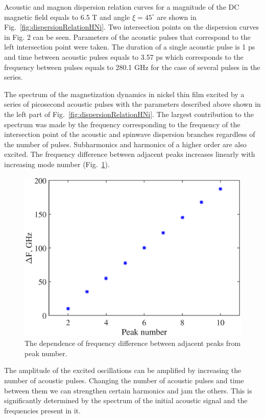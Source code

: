 \documentclass[%
superscriptaddress,
preprint,
showpacs,
amsmath,
amssymb,
aps,
prl,
]{revtex4-1}
\begin{document}
Acoustic and magnon dispersion relation curves for a magnitude of the DC magnetic field equals to 6.5 T and angle $\xi = 45^{\circ}$  are shown in Fig.~\ref{fig:dispersionRelationHNi}. Two intersection points on the dispersion curves in Fig. 2 can be seen. Parameters of the acoustic pulses that correspond to the left intersection point were taken. The duration of a single acoustic pulse is 1 ps and time between acoustic pulses equals to 3.57 ps which corresponds to the frequency between pulses equals to 280.1 GHz for the case of several pulses in the series.
	
The spectrum of the magnetization dynamics in nickel thin film excited by a series of picosecond acoustic pulses with the parameters described above shown in the left part of Fig.~\ref{fig:dispersionRelationHNi}. The largest contribution to the spectrum was made by the frequency corresponding to the frequency of the intersection point of the acoustic and spinwave dispersion branches regardless of the number of pulses. Subharmonics and harmonics of a higher order are also excited. The frequency difference between adjacent peaks increases linearly with increasing mode number (Fig.~\ref{fig:dF_regularity}).
	
\begin{figure}[ht]
	\centering
	\includegraphics[width=0.95\columnwidth]{dF_regularity.eps}
	\caption{The dependence of frequency difference between adjacent peaks from peak number.}
	\label{fig:dF_regularity}
\end{figure}
	
The amplitude of the excited oscillations can be amplified by increasing the number of acoustic pulses. Changing the number of acoustic pulses and time between them we can strengthen certain harmonics and jam the others. This is significantly determined by the spectrum of the initial acoustic signal and the frequencies present in it.
	
\end{document}
